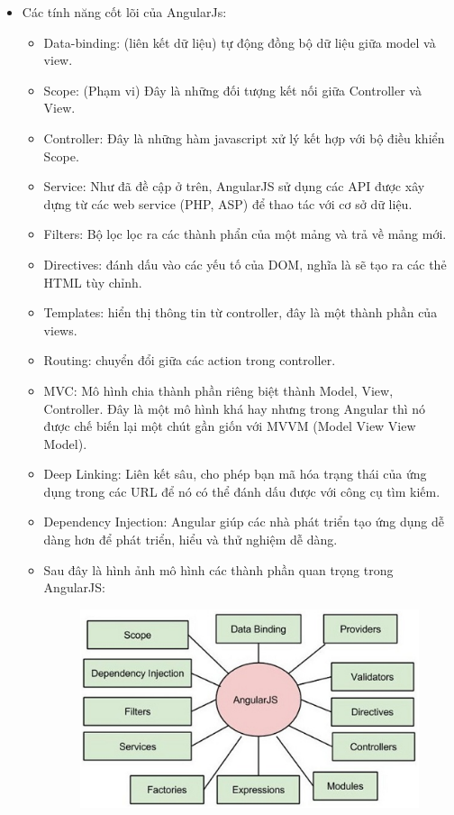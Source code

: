 \documentclass[12pt]{article}
\begin{document}
\begin{itemize}
\item Các tính năng cốt lõi của AngularJs:
\begin{itemize}
 \item Data-binding: (liên kết dữ liệu) tự động đồng bộ dữ liệu giữa model và view.
 \item Scope: (Phạm vi) Đây là những đối tượng kết nối giữa Controller và View.
 \item Controller: Đây là những hàm javascript xử lý kết hợp với bộ điều khiển Scope.
 \item Service: Như đã đề cập ở trên, AngularJS sử dụng các API được xây dựng từ các web service (PHP, ASP) để thao tác với cơ sở dữ liệu.
 \item Filters: Bộ lọc lọc ra các thành phẩn của một mảng và trả về mảng mới.
 \item Directives:  đánh dấu vào các yếu tố của DOM, nghĩa là sẽ tạo ra các thẻ HTML tùy chỉnh.
 \item Templates: hiển thị thông tin từ controller, đây là một thành phần của views.
 \item Routing:  chuyển đổi giữa các action trong controller.
 \item MVC: Mô hình chia thành phần riêng biệt thành Model, View, Controller. Đây là một mô hình khá hay nhưng trong Angular thì nó được chế biến lại một chút gần giốn với MVVM (Model View View Model).
 \item Deep Linking: Liên kết sâu, cho phép bạn mã hóa trạng thái của ứng dụng  trong các URL  để nó có thể đánh dấu được với công cụ tìm kiếm.
 \item Dependency Injection: Angular giúp các nhà phát triển tạo ứng dụng  dễ dàng hơn để phát triển, hiểu và thử nghiệm dễ dàng.
 \item Sau đây là hình ảnh mô hình các thành phần quan trọng trong AngularJS:
\begin{figure}[H]
\centering
\includegraphics[scale = 1]{angular.png}

\end{figure}
\end{itemize}
\end{itemize}
\end{document}
